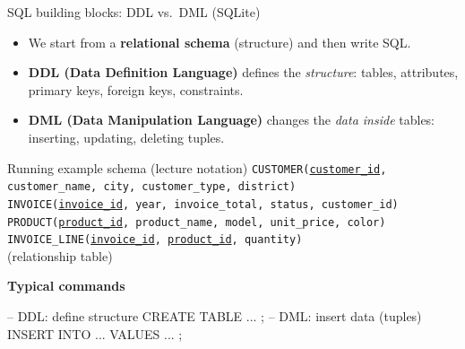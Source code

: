 \documentclass[10pt,aspectratio=169]{beamer}
\begin{document}
\begin{frame}[fragile]{SQL building blocks: DDL vs.\ DML (SQLite)}
\small
\begin{itemize}
  \item We start from a \textbf{relational schema} (structure) and then write SQL.
  \item \textbf{DDL (Data Definition Language)} defines the \emph{structure}:
        tables, attributes, primary keys, foreign keys, constraints.
  \item \textbf{DML (Data Manipulation Language)} changes the \emph{data inside} tables:
        inserting, updating, deleting tuples.
\end{itemize}

\vspace{1mm}
\begin{block}{Running example schema (lecture notation)}
\footnotesize
\texttt{CUSTOMER(}\underline{\texttt{customer\_id}}\texttt{, customer\_name, city, customer\_type, district)}\\
\texttt{INVOICE(}\underline{\texttt{invoice\_id}}\texttt{, year, invoice\_total, status, customer\_id)}\\
\texttt{PRODUCT(}\underline{\texttt{product\_id}}\texttt{, product\_name, model, unit\_price, color)}\\
\texttt{INVOICE\_LINE(}\underline{\texttt{invoice\_id}}\texttt{, }\underline{\texttt{product\_id}}\texttt{, quantity)}\\{\scriptsize (relationship table)}\\
\end{block}

\vspace{-1mm}
\textbf{Typical commands}
\begin{codesql}
-- DDL: define structure
CREATE TABLE ... ;
-- DML: insert data (tuples)
INSERT INTO ... VALUES ... ;
\end{codesql}
\end{frame}
\end{document}
